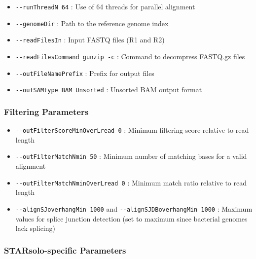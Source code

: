 \documentclass[
  11pt,
  a4paper,
]{report}
\providecommand{\tightlist}{%
  \setlength{\itemsep}{0pt}\setlength{\parskip}{0pt}}\usepackage{longtable,booktabs,array}
\begin{document}
\begin{itemize}
\tightlist
\item
  \texttt{-\/-runThreadN\ 64} : Use of 64 threads for parallel alignment
\item
  \texttt{-\/-genomeDir} : Path to the reference genome index
\item
  \texttt{-\/-readFilesIn} : Input FASTQ files (R1 and R2)
\item
  \texttt{-\/-readFilesCommand\ gunzip\ -c} : Command to decompress
  FASTQ.gz files
\item
  \texttt{-\/-outFileNamePrefix} : Prefix for output files
\item
  \texttt{-\/-outSAMtype\ BAM\ Unsorted} : Unsorted BAM output format
\end{itemize}

\subsubsection{Filtering Parameters}\label{filtering-parameters}

\begin{itemize}
\tightlist
\item
  \texttt{-\/-outFilterScoreMinOverLread\ 0} : Minimum filtering score
  relative to read length
\item
  \texttt{-\/-outFilterMatchNmin\ 50} : Minimum number of matching bases
  for a valid alignment
\item
  \texttt{-\/-outFilterMatchNminOverLread\ 0} : Minimum match ratio
  relative to read length
\item
  \texttt{-\/-alignSJoverhangMin\ 1000} and
  \texttt{-\/-alignSJDBoverhangMin\ 1000} : Maximum values for splice
  junction detection (set to maximum since bacterial genomes lack
  splicing)
\end{itemize}

\subsubsection{STARsolo-specific
Parameters}\label{starsolo-specific-parameters}
\end{document}
